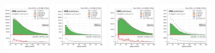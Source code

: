 \begin{figure}
    \centering
    \includegraphics[width=0.24\textwidth]{chapters/Appendix/sectionQCD/figures/4j1b/mu_leptonOnePt_True_mcqcd.png}
    \includegraphics[width=0.24\textwidth]{chapters/Appendix/sectionQCD/figures/4j1b/mu_leptonOnePt_False.png}
    \includegraphics[width=0.24\textwidth]{chapters/Appendix/sectionQCD/figures/4j1b/e_leptonOnePt_True_mcqcd.png}
    \includegraphics[width=0.24\textwidth]{chapters/Appendix/sectionQCD/figures/4j1b/e_leptonOnePt_False.png}
    

\end{figure}
